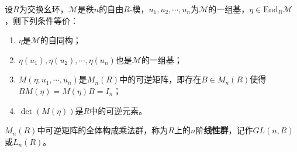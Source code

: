\documentclass[../../main.tex]{subfiles}%
\begin{document}
\begin{theorem}
设$R$为交换幺环，$\mathscr{M}$是秩$n$的自由$R$-模，$u_1,u_2,\cdots,u_n$为$\mathscr{M}$的一组基，$\eta\in\mathrm{End}_R\mathscr{M}$，则下列条件等价：
\begin{enumerate}[(1)]
\item $\eta$是$\mathscr{M}$的自同构；
\item $\eta(u_1),\eta(u_2),\cdots,\eta(u_n)$也是$\mathscr{M}$的一组基；
\item $M(\eta;u_1,\cdots,u_n)$是$M_n(R)$中的可逆矩阵，即存在$B\in M_n(R)$使得$BM(\eta)=M(\eta)B=I_n$；
\item $\det(M(\eta))$是$R$中的可逆元素。
\end{enumerate}
\end{theorem}

\begin{definition}
$M_n(R)$中可逆矩阵的全体构成乘法群，称为$R$上的$n$阶\textbf{线性群}，记作$GL(n,R)$或$L_n(R)$。
\end{definition}
\end{document}
